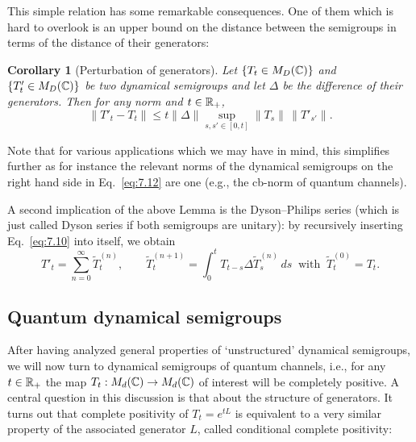 \documentclass[11pt,a4paper]{article}
\theoremstyle{plain}
\newtheorem{corollary}{Corollary}
\begin{document}
This simple relation has some remarkable consequences. One of them which is hard to overlook is an upper bound on the distance between the semigroups in terms of the distance of their generators:

\begin{corollary}[Perturbation of generators]
    Let $\{T_t\in M_D(\mathbb{C})\}$ and $\{T'_t\in M_D(\mathbb{C})\}$ be two dynamical semigroups and let $\Delta$ be the difference of their generators. Then for any norm and $t\in\mathbb{R}_{+}$,
    \begin{equation}\label{eq:7.12}
        \lVert T'_t-T_t\rVert
        \le t\lVert\Delta\rVert \sup_{s,s'\in[0,t]}\lVert T_s\rVert\,\lVert T'_{s'}\rVert.
    \end{equation}
\end{corollary}

Note that for various applications which we may have in mind, this simplifies further as for instance the relevant norms of the dynamical semigroups on the right hand side in Eq.~\eqref{eq:7.12} are one (e.g., the cb-norm of quantum channels).

A second implication of the above Lemma is the Dyson--Philips series (which is just called Dyson series if both semigroups are unitary): by recursively inserting Eq.~\eqref{eq:7.10} into itself, we obtain
\begin{equation}\label{eq:7.13}
    T'_t = \sum_{n=0}^{\infty}\tilde{T}^{(n)}_t,
    \qquad
    \tilde{T}^{(n+1)}_t = \int_0^t T_{t-s}\Delta \tilde{T}^{(n)}_s\,ds
    \ \text{ with }\
    \tilde{T}^{(0)}_t=T_t.
\end{equation}

\subsection{Quantum dynamical semigroups}

After having analyzed general properties of `unstructured' dynamical semigroups, we will now turn to dynamical semigroups of quantum channels, i.e., for any $t\in\mathbb{R}_{+}$ the map $T_t:M_d(\mathbb{C})\to M_d(\mathbb{C})$ of interest will be completely positive. A central question in this discussion is that about the structure of generators. It turns out that complete positivity of $T_t=e^{tL}$ is equivalent to a very similar property of the associated generator $L$, called conditional complete positivity:
\end{document}

